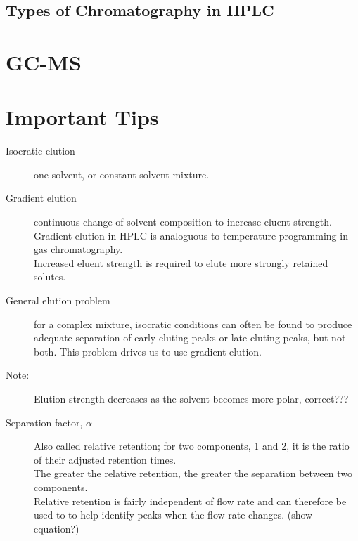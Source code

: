\documentclass[a4paper, 12pt]{article}
\begin{document}
\subsection{Types of Chromatography in HPLC}


\section{GC-MS}


\section{Important Tips}

\begin{description}
	\item[Isocratic elution] one solvent, or constant solvent mixture.
	\item[Gradient elution] continuous change of solvent composition to increase eluent strength. \\ Gradient elution in HPLC is analoguous to temperature programming in gas chromatography. \\ Increased eluent strength is required to elute more strongly retained solutes.
	\item[General elution problem] for a complex mixture, isocratic conditions can often be found to produce adequate separation of early-eluting peaks or late-eluting peaks, but not both. This problem drives us to use gradient elution.
	\item[Note:] Elution strength decreases as the solvent becomes more polar, correct???
	\item[Separation factor, $\alpha$] Also called relative retention; for two components, 1 and 2, it is the ratio of their adjusted retention times. \\ The greater the relative retention, the greater the separation between two components. \\ Relative retention is fairly independent of flow rate and can therefore be used to to help identify peaks when the flow rate changes. (show equation?)
\end{description}
\end{document}
